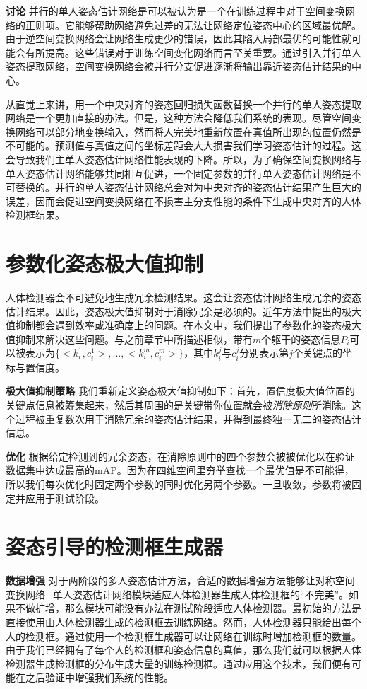 \textbf{讨论} 并行的单人姿态估计网络是可以被认为是一个在训练过程中对于空间变换网络的正则项。它能够帮助网络避免过差的无法让网络定位姿态中心的区域最优解。由于逆空间变换网络会让网络生成更少的错误，因此其陷入局部最优的可能性就可能会有所提高。这些错误对于训练空间变化网络而言至关重要。通过引入并行单人姿态提取网络，空间变换网络会被并行分支促进逐渐将输出靠近姿态估计结果的中心。

从直觉上来讲，用一个中央对齐的姿态回归损失函数替换一个并行的单人姿态提取网络是一个更加直接的办法。但是，这种方法会降低我们系统的表现。尽管空间变换网络可以部分地变换输入，然而将人完美地重新放置在真值所出现的位置仍然是不可能的。预测值与真值之间的坐标差距会大大损害我们学习姿态估计的过程。这会导致我们主单人姿态估计网络性能表现的下降。所以，为了确保空间变换网络与单人姿态估计网络能够共同相互促进，一个固定参数的并行单人姿态估计网络是不可替换的。并行的单人姿态估计网络总会对为中央对齐的姿态估计结果产生巨大的误差，因而会促进空间变换网络在不损害主分支性能的条件下生成中央对齐的人体检测框结果。

\section{参数化姿态极大值抑制}
人体检测器会不可避免地生成冗余检测结果。这会让姿态估计网络生成冗余的姿态估计结果。因此，姿态极大值抑制对于消除冗余是必须的。近年方法中提出的极大值抑制都会遇到效率或准确度上的问题。在本文中，我们提出了参数化的姿态极大值抑制来解决这些问题。与之前章节中所描述相似，带有$m$个躯干的姿态信息$P_i$可以被表示为$\{<k_i^1, c_i^1>, ...,<k_i^m, c_i^m>\}$，其中$k_i^j$与$c_i^j$分别表示第$j$个关键点的坐标与置信度。

\textbf{极大值抑制策略} 我们重新定义姿态极大值抑制如下：首先，置信度极大值位置的关键点信息被筹集起来，然后其周围的是关键带你位置就会被\textit{消除原则}所消除。这个过程被重复数次用于消除冗余的姿态估计结果，并得到最终独一无二的姿态估计信息。

\textbf{优化} 根据给定检测到的冗余姿态，在消除原则中的四个参数会被被优化以在验证数据集中达成最高的mAP。因为在四维空间里穷举查找一个最优值是不可能得，所以我们每次优化时固定两个参数的同时优化另两个参数。一旦收敛，参数将被固定并应用于测试阶段。

\section{姿态引导的检测框生成器}
\textbf{数据增强} 对于两阶段的多人姿态估计方法，合适的数据增强方法能够让对称空间变换网络+单人姿态估计网络模块适应人体检测器生成人体检测框的“不完美”。如果不做扩增，那么模块可能没有办法在测试阶段适应人体检测器。最初始的方法是直接使用由人体检测器生成的检测框去训练网络。然而，人体检测器只能给出每个人的检测框。通过使用一个检测框生成器可以让网络在训练时增加检测框的数量。由于我们已经拥有了每个人的检测框和姿态信息的真值，那么我们就可以根据人体检测器生成检测框的分布生成大量的训练检测框。通过应用这个技术，我们便有可能在之后验证中增强我们系统的性能。

